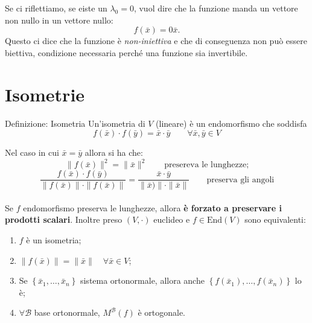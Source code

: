 \documentclass[x11names]{article}
\begin{document}
\noindent
Se ci riflettiamo, se eiste un $\lambda_0 = 0$, vuol dire che la funzione manda un vettore non nullo in  un vettore nullo:
\[
f\left(\bar{x}\right) = 0\bar{x}
.\] 
Questo ci dice che la funzione è \textit{non-iniettiva} e che di conseguenza non può essere biettiva, condizione necessaria perché una funzione sia invertibile.





\section{Isometrie}
	\begin{center}
	\colorbox{myblue}{\begin{minipage}{5.75in}
			\begin{blues}{Definizione: Isometria}
				Un'isometria di $V$ (lineare) è un endomorfismo che soddisfa
				\[
				f(\bar{x}) \cdot f(\bar{y}) = \bar{x} \cdot \bar{y} \qquad \forall \bar{x},\bar{y} \in V
				\]
			\end{blues}
	\end{minipage}}       
\end{center}

Nel caso in cui $\bar{x} = \bar{y}$ allora si ha che:
\[
\| f(\bar{x}) \|^2  = \| \bar{x} \|^2 \qquad \text{presereva le lunghezze;}
\]
\[
\frac{f(\bar{x})\cdot f(\bar{y})}{\| f(\bar{x}) \| \cdot \| f(\bar{x}) \|} = \frac{\bar{x}\cdot \bar{y}}{\| \bar{x}) \| \cdot \| \bar{x} \|} \qquad \text{preserva gli angoli}
\] \\

\noindent
Se $f$ endomorfismo preserva le lunghezze, allora \textbf{è forzato a preservare i prodotti scalari}. Inoltre preso $(V,\cdot)$ euclideo e $f\in \text{End}(V)$ sono equivalenti:
\begin{enumerate}
	\item $f$ è un isometria;
	\item $\| f(\bar{x}) \|  = \| \bar{x} \| \quad \forall \bar{x} \in V$;
	\item Se $\left\{\bar{x}_{1},\dots,\bar{x}_{n}\right\}$ sistema ortonormale, allora anche $\left\{f(\bar{x}_{1}),\dots,f(\bar{x}_{n})\right\}$ lo è;
	\item $\forall \mathcal{B}$ base ortonormale, $M^\mathcal{B}(f)$ è ortogonale.
\end{enumerate}
\end{document}
